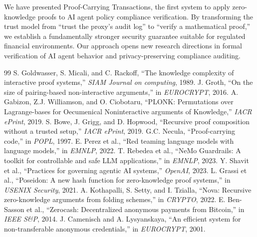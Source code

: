 \documentclass[conference]{IEEEtran}
\begin{document}
We have presented Proof-Carrying Transactions, the first system to apply zero-knowledge proofs to AI agent policy compliance verification. By transforming the trust model from ``trust the proxy's audit log'' to ``verify a mathematical proof,'' we establish a fundamentally stronger security guarantee suitable for regulated financial environments. Our approach opens new research directions in formal verification of AI agent behavior and privacy-preserving compliance auditing.

\begin{thebibliography}{99}
 S. Goldwasser, S. Micali, and C. Rackoff, ``The knowledge complexity of interactive proof systems,'' \textit{SIAM Journal on computing}, 1989.
 J. Groth, ``On the size of pairing-based non-interactive arguments,'' in \textit{EUROCRYPT}, 2016.
 A. Gabizon, Z.J. Williamson, and O. Ciobotaru, ``PLONK: Permutations over Lagrange-bases for Oecumenical Noninteractive arguments of Knowledge,'' \textit{IACR ePrint}, 2019.
 S. Bowe, J. Grigg, and D. Hopwood, ``Recursive proof composition without a trusted setup,'' \textit{IACR ePrint}, 2019.
 G.C. Necula, ``Proof-carrying code,'' in \textit{POPL}, 1997.
 E. Perez et al., ``Red teaming language models with language models,'' in \textit{EMNLP}, 2022.
 T. Rebedea et al., ``NeMo Guardrails: A toolkit for controllable and safe LLM applications,'' in \textit{EMNLP}, 2023.
 Y. Shavit et al., ``Practices for governing agentic AI systems,'' \textit{OpenAI}, 2023.
 L. Grassi et al., ``Poseidon: A new hash function for zero-knowledge proof systems,'' in \textit{USENIX Security}, 2021.
 A. Kothapalli, S. Setty, and I. Tzialla, ``Nova: Recursive zero-knowledge arguments from folding schemes,'' in \textit{CRYPTO}, 2022.
 E. Ben-Sasson et al., ``Zerocash: Decentralized anonymous payments from Bitcoin,'' in \textit{IEEE S\&P}, 2014.
 J. Camenisch and A. Lysyanskaya, ``An efficient system for non-transferable anonymous credentials,'' in \textit{EUROCRYPT}, 2001.
\end{thebibliography}
\end{document}

